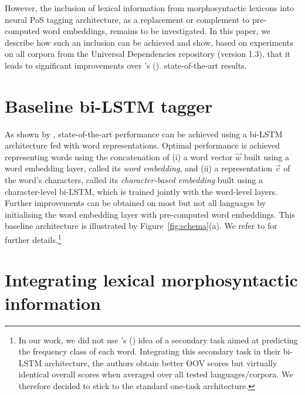 \documentclass[11pt,letterpaper]{article}
\begin{document}
However, the inclusion of lexical information from morphosyntactic lexicons into neural PoS tagging architecture, as a
replacement or complement to pre-computed word embeddings, remains to be investigated. In this paper, we describe how
such an inclusion can be achieved and show, based on experiments on all corpora from the Universal Dependencies
repository (version 1.3), that it leads to significant improvements over \citeauthor{plank16}'s (\citeyear{plank16}).
state-of-the-art results.

\section{Baseline bi-LSTM tagger}

As shown by \citet{plank16}, state-of-the-art performance can be achieved using a bi-LSTM architecture fed with word
representations. Optimal performance is achieved representing words using the concatenation of (i) a word vector
$\vec{w}$ built using a word embedding layer, called its {\em word embedding}, and (ii) a representation $\vec{c}$ of
the word's characters, called its {\em character-based embedding} built using a character-level bi-LSTM, which is
trained jointly with the word-level layers. Further improvements can be obtained on most but not all languages by
initialising the word embedding layer with pre-computed word embeddings. This baseline architecture is illustrated by
Figure~\ref{fig:schema}(a). We refer to \citet{plank16} for further details.\footnote{In our work, we did not use
  \citeauthor{plank16}'s (\citeyear{plank16}) idea of a secondary task aimed at predicting the frequency class of each
  word. Integrating this secondary task in their bi-LSTM architecture, the authors obtain better OOV scores but
  virtually identical overall scores when averaged over all tested languages/corpora. We therefore decided to stick to
  the standard one-task architecture. }

\section{Integrating lexical morphosyntactic information}
\end{document}
